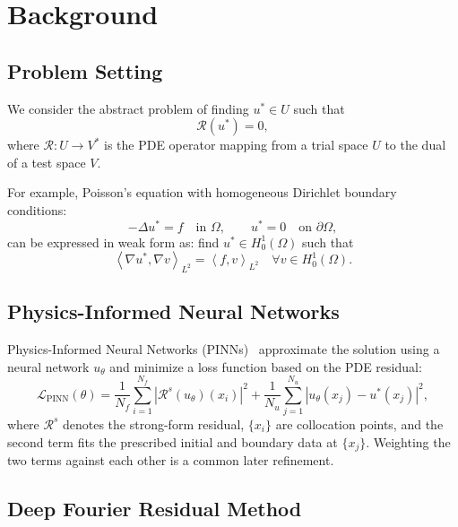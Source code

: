 \documentclass[preprint,11pt]{elsarticle}
\newcommand{\inner}[2]{\left\langle #1, #2 \right\rangle}
\begin{document}
\section{Background}
\label{sec:background}

\subsection{Problem Setting}

We consider the abstract problem of finding $u^* \in U$ such that
\begin{equation}
    \mathcal{R}(u^*) = 0,
\end{equation}
where $\mathcal{R}: U \to V^*$ is the PDE operator mapping from a trial space $U$ to the dual of a test space $V$.

For example, Poisson's equation with homogeneous Dirichlet boundary conditions:
\begin{equation}
    -\Delta u^* = f \quad \text{in } \Omega, \qquad u^* = 0 \quad \text{on } \partial\Omega,
\end{equation}
can be expressed in weak form as: find $u^* \in H^1_0(\Omega)$ such that
\begin{equation}
    \inner{\nabla u^*}{\nabla v}_{L^2} = \inner{f}{v}_{L^2} \quad \forall v \in H^1_0(\Omega).
\end{equation}

\subsection{Physics-Informed Neural Networks}

Physics-Informed Neural Networks (PINNs)~\citep{raissi2019physics} approximate the solution using a neural network $u_\theta$ and minimize a loss function based on the PDE residual:
\begin{equation}
    \mathcal{L}_{\text{PINN}}(\theta) = \frac{1}{N_f} \sum_{i=1}^{N_f} |\mathcal{R}^s(u_\theta)(x_i)|^2
        + \frac{1}{N_u} \sum_{j=1}^{N_u} |u_\theta(x_j) - u^*(x_j)|^2 ,
\end{equation}
where $\mathcal{R}^s$ denotes the strong-form residual, $\{x_i\}$ are collocation points, and the second term fits the prescribed initial and boundary data at $\{x_j\}$. Weighting the two terms against each other is a common later refinement.

\subsection{Deep Fourier Residual Method}
\end{document}
